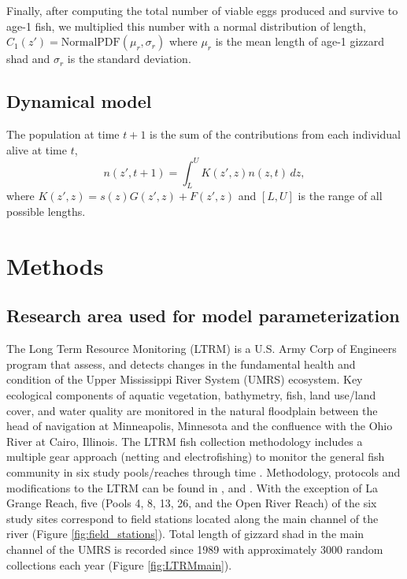 \documentclass[preprint,review,12pt,authoryear]{elsarticle}
\def\ds{\displaystyle}
\begin{document}
Finally, after computing the total number of viable eggs produced and survive to age-1 fish, we multiplied this number with a normal distribution of length,
$ \ds C_1 (z') =  \mathrm{Normal PDF} (\mu_r, \sigma_r)$ where $\mu_r$ is the mean length of age-1 gizzard shad and $\sigma_r$ is the standard deviation. 

\subsection{Dynamical model} 
The population at time $t+1$ is the sum of the contributions from each individual alive at time $t$,
\begin{equation}\label{eq:IPM}
n(z',t+1) = \int_L^U K(z',z)n(z,t) \,dz,
\end{equation}  
where $K(z',z) = s(z) G(z',z) + F(z',z)$ and $[L,U]$ is the range of all possible lengths.

\section{Methods}
\subsection{Research area used for model parameterization}
The Long Term Resource Monitoring (LTRM) is a U.S. Army Corp of Engineers program that assess, and detects changes in the fundamental health and condition of the Upper Mississippi River System (UMRS) ecosystem.  
Key ecological components of aquatic vegetation, bathymetry, fish, land use/land cover, and water quality are monitored in the natural floodplain between the head of navigation at Minneapolis, Minnesota and the confluence with the Ohio River at Cairo, Illinois. 
The LTRM fish collection methodology includes a multiple gear approach (netting and electrofishing) to monitor the general fish community in six study pools/reaches through time \citep{gutreuter1995long}.
Methodology, protocols and modifications to the LTRM can be found in \cite{gutreuter1995long}, and \cite{ickes2002evaluation}. 
With the exception of La Grange Reach, five (Pools 4, 8, 13, 26, and the Open River Reach) of the six study sites correspond to field stations located along the main channel of the river (Figure \ref{fig:field_stations}).
Total length of gizzard shad in the main channel of the UMRS is recorded since 1989 with approximately 3000 random collections each year (Figure \ref{fig:LTRMmain}). 
\end{document}
